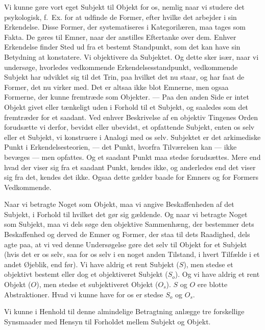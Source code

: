 \documentclass[12pt,a4paper]{book}
\newcommand{\apage}[1]{\marginnote{\footnotesize\textit{[#1]}}}
\begin{document}
Vi kunne gøre vort eget Subjekt til Objekt for os, nemlig naar vi studere det
psykologisk, f.\ Ex. for at udfinde de Former, efter hvilke det arbejder i sin
Erkendelse. Disse Former, der systematiseres i Kategorilæren, maa tages som Fakta. De
gøres til Emner, naar der anstilles Eftertanke over dem. Enhver Erkendelse finder Sted
ud fra et bestemt Standpunkt, som det kan have sin Betydning at konstatere. Vi
objektivere da Subjektet. Og dette sker især, naar vi undersøge, hvorledes vedkommende
Erkendelsesstandpunkt, vedkommende Subjekt har udviklet sig til det Trin, paa hvilket
det nu staar, og har faat de Former, det nu virker med. Det er altsaa ikke blot
Emnerne, men ogsaa Formerne, der kunne fremtræde som Objekter. --- Paa den anden Side
er intet Objekt givet eller tænkeligt uden i Forhold til et Subjekt, og saaledes som
det fremtræder for et saadant. Ved enhver Beskrivelse af en objektiv Tingenes Orden
forudsætte vi derfor, bevidst eller ubevidst, et opfattende Subjekt, enten os selv
eller et Subjekt, vi konstruere i Analogi med os selv. Subjektet er det arkimediske Punkt i Erkendelsesteorien, --- det Punkt, hvorfra Tilværelsen kan --- ikke bevæges
--- men opfattes. Og et saadant Punkt maa stedse forudsættes. Mere end hvad der viser
sig fra et saadant Punkt, kendes ikke, og anderledes end det viser sig fra det, kendes
det ikke. Ogsaa dette gælder baade for Emners og for Formers Vedkommende.

\apage{298} Naar vi betragte Noget som Objekt, maa vi angive Beskaffenheden af det Subjekt, i
Forhold til hvilket det gør sig gældende. Og naar vi betragte Noget som Subjekt, maa
vi dels søge den objektive Sammenhæng, der bestemmer dets Beskaffenhed og derved de
Emner og Former, der staa til dets Raadighed, dels agte paa, at vi ved denne
Undersøgelse gøre det selv til Objekt for et Subjekt (hvis det er os selv, saa for os
selv i en noget anden Tilstand, i hvert Tilfælde i et andet Øjeblik, end før). Vi have
aldrig et rent Subjekt ($S$), men stedse et objektivt bestemt eller dog et
objektiveret Subjekt ($S_o$). Og vi have aldrig et rent Objekt ($O$), men stedse et
subjektiveret Objekt ($O_s$). $S$ og $O$ ere blotte Abstraktioner. Hvad vi kunne have
for os er stedse $S_o$ og $O_s$.

Vi kunne i Henhold til denne almindelige Betragtning anlægge tre forskellige
Synsmaader med Hensyn til Forholdet mellem Subjekt og Objekt.
\end{document}
